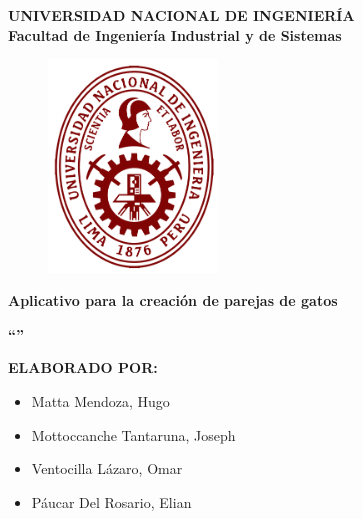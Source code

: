 \begin{titlepage}
	
	
	\begin{center}
		{\LARGE \textbf{UNIVERSIDAD NACIONAL DE INGENIERÍA}}\\
		\vspace{5 mm}
		{\LARGE \textbf{Facultad de Ingeniería Industrial y de Sistemas}}\\
		\vspace{6.5 mm}
		\begin{figure}[h]
			\centering 
			\includegraphics[width=0.4\textwidth]{images/logo-UNI.png}
		\end{figure}
		\vspace{4 mm}	
		{\Large \textbf{Aplicativo para la creación de parejas de gatos} }\\
		\vspace{5 mm}
		
		\onehalfspacing  %
		{\Large \textbf{``{\@TinderCat}''} }\\
		
		\singlespacing  %
		
		\vspace{4 mm}	

		\vspace{10 mm}
		{\large \textbf{ELABORADO POR:} }\\
		\vspace{10 mm}
		\begin{center}
			\begin{minipage}{0.6\textwidth}
			  \begin{itemize}
				\item \Large Matta Mendoza, Hugo
				\item \Large Mottoccanche Tantaruna, Joseph
				\item \Large Ventocilla Lázaro, Omar
				\item \Large Páucar Del Rosario, Elian
			  \end{itemize}
			\end{minipage}
		  \end{center}

		\vspace{5 mm}	
	\end{center}

\end{titlepage}
